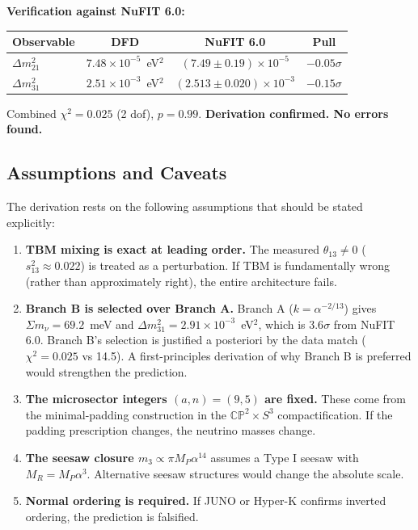 \documentclass[11pt,a4paper]{article}
\begin{document}
\begin{tcolorbox}[colback=blue!3!white, colframe=blue!60!black,
  title=\textbf{Finding \thesection: Neutrino mass prediction verified
  from Appendix X}\label{find:neutrino}]
\textbf{Verification against NuFIT 6.0:}
\begin{center}
\begin{tabular}{lccc}
\toprule
Observable & DFD & NuFIT 6.0 & Pull \\
\midrule
$\Delta m^2_{21}$ & $7.48 \times 10^{-5}$~eV$^2$ &
  $(7.49 \pm 0.19) \times 10^{-5}$ & $-0.05\sigma$ \\
$\Delta m^2_{31}$ & $2.51 \times 10^{-3}$~eV$^2$ &
  $(2.513 \pm 0.020) \times 10^{-3}$ & $-0.15\sigma$ \\
\bottomrule
\end{tabular}
\end{center}

Combined $\chi^2 = 0.025$ (2 dof), $p = 0.99$.
\textbf{Derivation confirmed. No errors found.}
\end{tcolorbox}

\subsection{Assumptions and Caveats}

The derivation rests on the following assumptions that should be stated
explicitly:

\begin{enumerate}
\item \textbf{TBM mixing is exact at leading order.} The measured
  $\theta_{13} \neq 0$ ($s_{13}^2 \approx 0.022$) is treated as a
  perturbation. If TBM is fundamentally wrong (rather than approximately
  right), the entire architecture fails.

\item \textbf{Branch B is selected over Branch A.} Branch A ($k =
  \alpha^{-2/13}$) gives $\Sigma m_\nu = 69.2$~meV and
  $\Delta m^2_{31} = 2.91 \times 10^{-3}$~eV$^2$, which is
  3.6$\sigma$ from NuFIT 6.0. Branch B's selection is justified
  a posteriori by the data match ($\chi^2 = 0.025$ vs 14.5).
  A first-principles derivation of why Branch B is preferred
  would strengthen the prediction.

\item \textbf{The microsector integers $(a, n) = (9, 5)$ are fixed.}
  These come from the minimal-padding construction in the
  $\mathbb{CP}^2 \times S^3$ compactification. If the padding
  prescription changes, the neutrino masses change.

\item \textbf{The seesaw closure $m_3 \propto \pi M_P \alpha^{14}$}
  assumes a Type I seesaw with $M_R = M_P \alpha^3$. Alternative
  seesaw structures would change the absolute scale.

\item \textbf{Normal ordering is required.} If JUNO or Hyper-K
  confirms inverted ordering, the prediction is falsified.
\end{enumerate}
\end{document}

